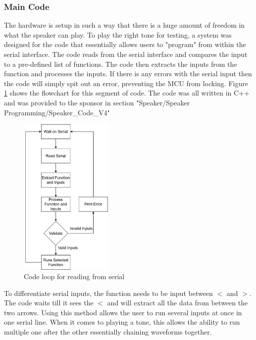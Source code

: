 \documentclass[12pt, a4paper]{article}
\begin{document}
\subsubsection{Main Code}
The hardware is setup in such a way that there is a huge amount of freedom in what the speaker can play. To play the right tone for testing, a system was designed for the code that essentially allows users to "program" from within the serial interface. The code reads from the serial interface and compares the input to a pre-defined list of functions. The code then extracts the inputs from the function and processes the inputs. If there is any errors with the serial input then the code will simply spit out an error, preventing the MCU from locking. Figure \ref{fig:L_Code_Loop} shows the flowchart for this segment of code. The code was all written in C++ and was provided to the sponsor in section "Speaker/Speaker Programming/Speaker\_Code\_V4" \\
\begin{figure} [!htb]
	\hfill\includegraphics[width=0.4\textwidth]{./images/speaker/L_Code_Loop}\hspace{\fill}
	\caption{Code loop for reading from serial}
	\label{fig:L_Code_Loop}
\end{figure} 

To differentiate serial inputs, the function needs to be input between $<$ and $>$. The code waits till it sees the $<$ and will extract all the data from between the two arrows. Using this method allows the user to run several inputs at once in one serial line. When it comes to playing a tone, this allows the ability to run multiple one after the other essentially chaining waveforms together. \\
\end{document}
